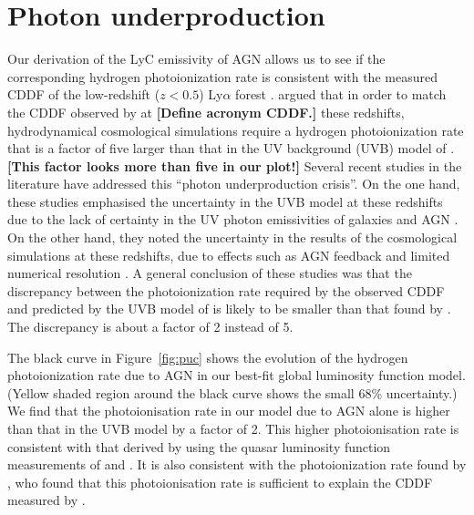 \documentclass[a4paper,fleqn,usenatbib]{mnras}
\newcommand{\gk}[1]{{\bf \color{notecolor} [#1]}}
\begin{document}
\section{Photon underproduction}

Our derivation of the LyC emissivity of AGN allows us to see if the
corresponding hydrogen photoionization rate is consistent with the
measured CDDF of the low-redshift ($z<0.5$) Ly$\alpha$ forest
\citep{2016ApJ...817..111D}.  \citet{2014ApJ...789L..32K} argued that
in order to match the CDDF observed by \citet{2016ApJ...817..111D} at
\gk{Define acronym CDDF.}  these redshifts, hydrodynamical
cosmological simulations require a hydrogen photoionization rate that
is a factor of five larger than that in the UV background (UVB) model
of \citet{2012ApJ...746..125H}.  \gk{This factor looks more than five
  in our plot!}  Several recent studies in the literature have
addressed this ``photon underproduction crisis''.  On the one hand,
these studies emphasised the uncertainty in the
\citet{2012ApJ...746..125H} UVB model at these redshifts due to the
lack of certainty in the UV photon emissivities of galaxies and AGN
\citep{2015MNRAS.451L..30K, 2015ApJ...811....3S}.  On the other hand,
they noted the uncertainty in the results of the cosmological
simulations at these redshifts, due to effects such as AGN feedback
and limited numerical resolution \citep{2015ApJ...811....3S,
  2017MNRAS.467L..86V, 2017MNRAS.471.1056N, 2017ApJ...837..106O,
  2017MNRAS.466..838G, 2017MNRAS.467.3172G, 2017ApJ...835..175G}.  A
general conclusion of these studies was that the discrepancy between
the photoionization rate required by the observed CDDF and predicted
by the UVB model of \citet{2012ApJ...746..125H} is likely to be
smaller than that found by \citet{2014ApJ...789L..32K}.  The
discrepancy is about a factor of 2 instead of 5.

The black curve in Figure~\ref{fig:puc} shows the evolution of the
hydrogen photoionization rate due to AGN in our best-fit global
luminosity function model.  (Yellow shaded region around the black
curve shows the small 68\% uncertainty.)  We find that the
photoionisation rate in our model due to AGN alone is higher than that
in the \citet{2012ApJ...746..125H} UVB model by a factor of 2.  This
higher photoionisation rate is consistent with that derived by
\citet{2015MNRAS.451L..30K} using the quasar luminosity function
measurements of \citet{2009MNRAS.392...19C} and
\citet{2013A&A...551A..29P}.  It is also consistent with the
photoionization rate found by \citet{2017MNRAS.467.3172G}, who found
that this photoionisation rate is sufficient to explain the CDDF
measured by \citet{2016ApJ...817..111D}.
\end{document}
